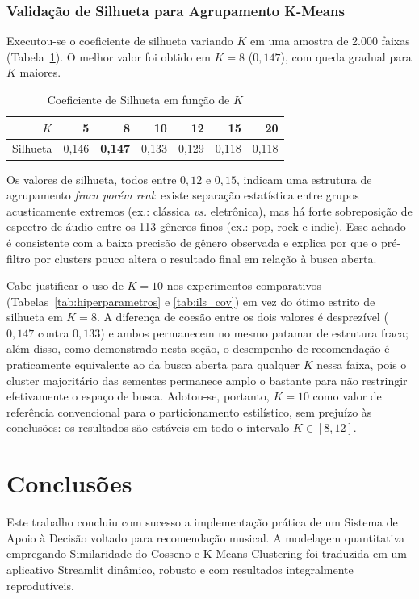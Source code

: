 \documentclass[12pt]{article}
\begin{document}
\subsubsection{Validação de Silhueta para Agrupamento K-Means}
Executou-se o coeficiente de silhueta variando $K$ em uma amostra de 2.000 faixas (Tabela~\ref{tab:silhueta}). O melhor valor foi obtido em $K=8$ ($0,147$), com queda gradual para $K$ maiores.

\begin{table}[H]
\centering
\caption{Coeficiente de Silhueta em função de $K$}
\label{tab:silhueta}
\begin{tabular}{rrrrrrr}
\toprule
$K$ & 5 & 8 & 10 & 12 & 15 & 20 \\
\midrule
Silhueta & 0,146 & \textbf{0,147} & 0,133 & 0,129 & 0,118 & 0,118 \\
\bottomrule
\end{tabular}
\end{table}

Os valores de silhueta, todos entre $0,12$ e $0,15$, indicam uma estrutura de agrupamento \textit{fraca porém real}: existe separação estatística entre grupos acusticamente extremos (ex.: clássica \textit{vs.} eletrônica), mas há forte sobreposição de espectro de áudio entre os 113 gêneros finos (ex.: pop, rock e indie). Esse achado é consistente com a baixa precisão de gênero observada e explica por que o pré-filtro por clusters pouco altera o resultado final em relação à busca aberta.

Cabe justificar o uso de $K=10$ nos experimentos comparativos (Tabelas~\ref{tab:hiperparametros} e \ref{tab:ils_cov}) em vez do ótimo estrito de silhueta em $K=8$. A diferença de coesão entre os dois valores é desprezível ($0,147$ contra $0,133$) e ambos permanecem no mesmo patamar de estrutura fraca; além disso, como demonstrado nesta seção, o desempenho de recomendação é praticamente equivalente ao da busca aberta para qualquer $K$ nessa faixa, pois o cluster majoritário das sementes permanece amplo o bastante para não restringir efetivamente o espaço de busca. Adotou-se, portanto, $K=10$ como valor de referência convencional para o particionamento estilístico, sem prejuízo às conclusões: os resultados são estáveis em todo o intervalo $K\in[8,12]$.

\section{Conclusões}
Este trabalho concluiu com sucesso a implementação prática de um Sistema de Apoio à Decisão voltado para recomendação musical. A modelagem quantitativa empregando Similaridade do Cosseno e K-Means Clustering foi traduzida em um aplicativo Streamlit dinâmico, robusto e com resultados integralmente reprodutíveis.
\end{document}
